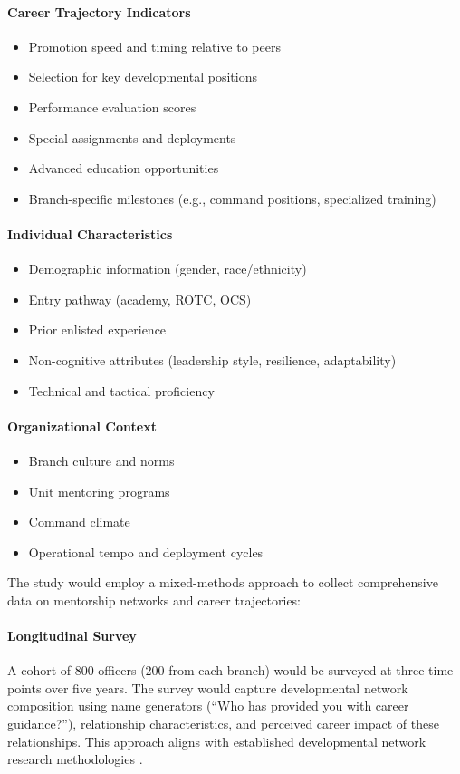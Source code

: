 \documentclass[main.tex]{subfiles}
\begin{document}
\paragraph{Career Trajectory Indicators}
\begin{itemize}
\item Promotion speed and timing relative to peers
\item Selection for key developmental positions
\item Performance evaluation scores
\item Special assignments and deployments
\item Advanced education opportunities
\item Branch-specific milestones (e.g., command positions, specialized training)
\end{itemize}

\paragraph{Individual Characteristics}
\begin{itemize}
\item Demographic information (gender, race/ethnicity)
\item Entry pathway (academy, ROTC, OCS)
\item Prior enlisted experience
\item Non-cognitive attributes (leadership style, resilience, adaptability)
\item Technical and tactical proficiency
\end{itemize}

\paragraph{Organizational Context}
\begin{itemize}
\item Branch culture and norms
\item Unit mentoring programs
\item Command climate
\item Operational tempo and deployment cycles
\end{itemize}


The study would employ a mixed-methods approach to collect comprehensive data on mentorship networks and career trajectories:

\paragraph{Longitudinal Survey} A cohort of 800 officers (200 from each branch) would be surveyed at three time points over five years. The survey would capture developmental network composition using name generators (``Who has provided you with career guidance?''), relationship characteristics, and perceived career impact of these relationships. This approach aligns with established developmental network research methodologies \parencite{higgins2023celebrating, cdc2015network}.
\end{document}
